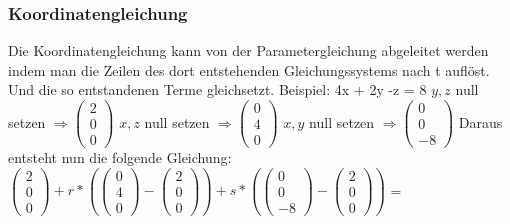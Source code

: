 \documentclass[11pt,a4paper,onecolumn]{scrartcl}
\begin{document}
\begin{flushleft}
\subsubsection{Koordinatengleichung}
Die Koordinatengleichung kann von der Parametergleichung abgeleitet werden indem man die Zeilen des dort entstehenden Gleichungssystems nach t auflöst. Und die so entstandenen Terme gleichsetzt. \linebreak
\newline
Beispiel: \linebreak
4x + 2y -z = 8 \linebreak
$y, z$ null setzen $\Rightarrow (\begin{smallmatrix} 2 \\ 0 \\ 0 \end{smallmatrix})$ \linebreak
$x, z$ null setzen $\Rightarrow (\begin{smallmatrix} 0 \\ 4 \\ 0 \end{smallmatrix})$ \linebreak 
$x, y$ null setzen $\Rightarrow (\begin{smallmatrix} 0 \\ 0 \\ -8 \end{smallmatrix})$ \linebreak 
Daraus entsteht nun die folgende Gleichung: \linebreak
$(\begin{smallmatrix} 2 \\ 0 \\ 0 \end{smallmatrix}) + r *((\begin{smallmatrix} 0 \\ 4 \\ 0 \end{smallmatrix}) - (\begin{smallmatrix} 2 \\ 0 \\ 0 \end{smallmatrix})) + s * ((\begin{smallmatrix} 0 \\ 0 \\ -8 \end{smallmatrix}) - (\begin{smallmatrix} 2 \\ 0 \\ 0 \end{smallmatrix}))$  = \linebreak

\end{flushleft}
\end{document}
